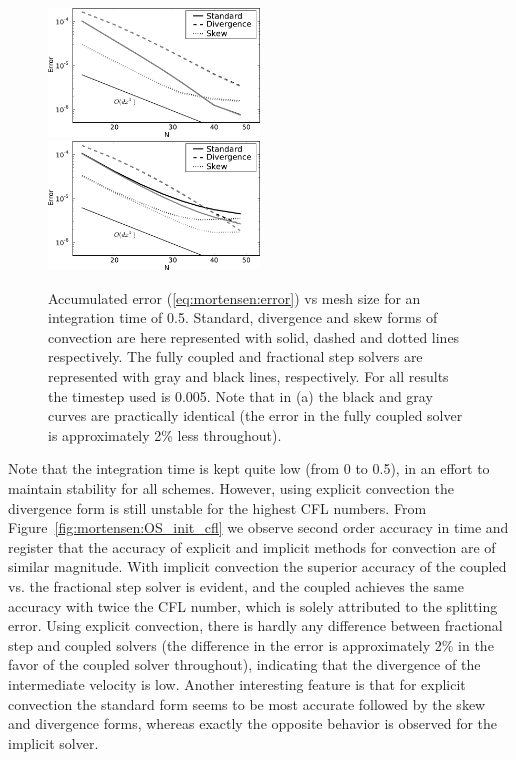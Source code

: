 \begin{figure}
 \includegraphics[width=0.5\textwidth]{chapters/mortensen/pdf/OS_init_dx_1.pdf}
%
 \includegraphics[width=0.5\textwidth]{chapters/mortensen/pdf/OS_init_dx_0.pdf}
%
 \caption{Accumulated error (\eqref{eq:mortensen:error}) vs mesh size for an integration time of 0.5. Standard, divergence and skew forms of convection are here represented with solid, dashed and dotted lines respectively. The fully coupled and fractional step solvers are represented with gray and black lines, respectively. For all results the timestep used is 0.005. Note that in (a) the black and gray curves are practically identical (the error in the fully coupled solver is approximately 2\% less throughout). }
\label{fig:mortensen:OS_init_dx}
\end{figure}
Note that the integration time is kept quite low (from 0 to 0.5), in an effort to maintain stability for all schemes. However, using explicit convection the divergence form is still unstable for the highest CFL numbers. From Figure~\ref{fig:mortensen:OS_init_cfl} we observe second order accuracy in time and register that the accuracy of explicit and implicit methods for convection are of similar magnitude. With implicit convection the superior accuracy of the coupled vs. the fractional step solver is evident, and the coupled achieves the same accuracy with twice the CFL number, which is solely attributed to the splitting error. Using explicit convection, there is hardly any difference between fractional step and coupled solvers (the difference in the error is approximately 2\% in the favor of the coupled solver throughout), indicating that the divergence of the intermediate velocity is low. Another interesting feature is that for explicit convection the standard form seems to be most accurate followed by the skew and divergence forms, whereas exactly the opposite behavior is observed for the implicit solver.

